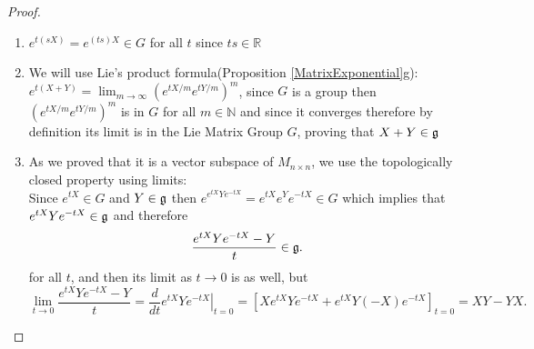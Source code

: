 \begin{proof}
\begin{enumerate}[label=(\alph*)]
	\item $e^{t(sX)}=e^{(ts)X} \in G$ for all $t$ since $ts \in \mathbb{R}$
	\item We will use Lie's product formula(Proposition \ref{MatrixExponential}g):
	$e^{t(X+Y)} = \lim_{m \rightarrow \infty}(e^{tX/m}e^{tY/m})^m$, since $G$ is a group then $(e^{tX/m}e^{tY/m})^m$ is in $G$ for all $m \in \mathbb{N}$ and since it converges therefore by definition its limit is in the Lie Matrix Group $G$, proving that $X+Y \in \mathfrak{g}$
	\item As we proved that it is a vector subspace of $M_{n\times n}$, we use the topologically closed property using limits:\\
	Since $e^{tX} \in G$ and $Y \in \mathfrak{g}$ then $e^{e^{tX}Ye^{-tX}} = e^{tX}e^{Y}e^{-tX} \in G$ which implies that $e^{tX}Ye^{-tX} \in\mathfrak{g}$ and therefore $$\frac{e^{tX}Ye^{-tX}-Y}{t} \in \mathfrak{g}.$$ for all $t$, and then its limit as $t\rightarrow 0$ is as well, but 
	$$\lim_{t\rightarrow 0}\frac{e^{tX}Ye^{-tX}-Y}{t} = \frac{d}{dt} \left.e^{tX}Ye^{-tX}\right|_{t=0} = [Xe^{tX}Ye^{-tX} + e^{tX}Y(-X)e^{-tX}]_{t=0} = XY-YX.$$
\end{enumerate}
\end{proof}